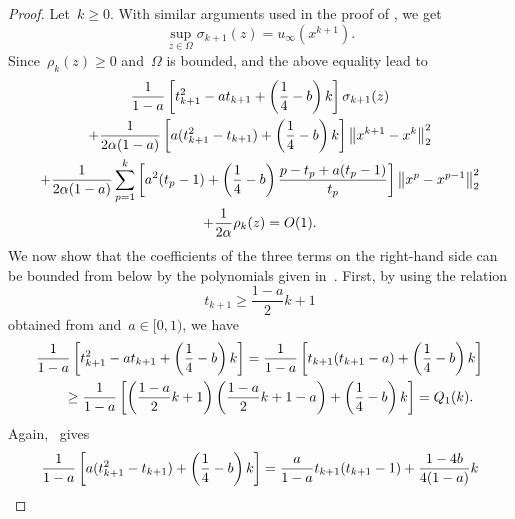 \documentclass[../main]{subfiles}
\begin{document}
\begin{proof}
    Let~$k \ge 0$.
    With similar arguments used in the proof of , we get
    \begin{equation}
        \sup_{z \in \Omega} \sigma_{k + 1}(z) = u_\infty\left(x^{k + 1}\right)
        .\end{equation}
    Since~$\rho_k(z) \ge 0$ and~$\Omega$ is bounded,  and the above equality lead to
    \begin{multline}
        \frac{1}{1 - a} \left[ t_{k + 1}^2 - a t_{k + 1} + \left( \frac{1}{4} - b \right) k \right] \sigma_{k + 1}(z) \\
        + \frac{1}{2 \alpha (1 - a)} \left[ a (t_{k + 1}^2 - t_{k + 1}) + \left( \frac{1}{4} - b \right) k \right] \norm*{x^{k + 1} - x^k}_2^2 \\
        + \frac{1}{2 \alpha (1 - a)} \sum_{p = 1}^{k} \left[ a^2 (t_p - 1) + \left( \frac{1}{4} - b \right) \frac{p - t_p + a(t_p - 1)}{t_p} \right] \norm*{x^p - x^{p - 1}}_2^2 \\
        + \frac{1}{2 \alpha} \rho_k(z)
        = O(1)
        .\end{multline}
    We now show that the coefficients of the three terms on the right-hand side can be bounded from below by the polynomials given in~.
    First, by using the relation
    \begin{equation} \label{eq:t k+1 geq}
        t_{k + 1} \ge \frac{1 - a}{2} k + 1
    \end{equation}
    obtained from  and~$a \in [0, 1)$, we have
                \begin{align}
                    \MoveEqLeft \frac{1}{1 - a} \left[ t_{k + 1}^2 - a t_{k + 1} + \left( \frac{1}{4} - b \right) k \right] = \frac{1}{1 - a} \left[ t_{k + 1} (t_{k + 1} - a) + \left( \frac{1}{4} - b \right) k \right] \\
                     & \ge \frac{1}{1 - a} \left[ \left( \frac{1 - a}{2} k + 1 \right) \left( \frac{1 - a}{2} k + 1 - a \right) + \left( \frac{1}{4} - b \right) k \right] = Q_1(k)
                    .\end{align}
                Again,~ gives
                \begin{align}
                    \MoveEqLeft \frac{1}{1 - a} \left[ a (t_{k + 1}^2 - t_{k + 1}) + \left( \frac{1}{4} - b \right) k \right]
                    = \frac{a}{1 - a} t_{k + 1} (t_{k + 1} - 1) + \frac{1 - 4 b}{4 (1 - a)} k                                                           \\

\end{align}
\end{proof}
\end{document}
